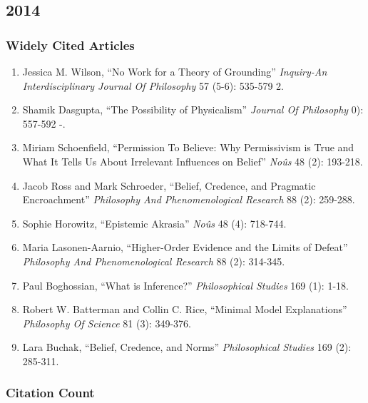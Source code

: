 \documentclass[
  10pt,
  letterpaper,
  DIV=11,
  numbers=noendperiod,
  twoside]{scrartcl}
\providecommand{\tightlist}{%
  \setlength{\itemsep}{0pt}\setlength{\parskip}{0pt}}\usepackage{longtable,booktabs,array}
\begin{document}
\newpage

\subsection{2014}\label{section-38}

\subsubsection*{Widely Cited Articles}\label{widely-cited-articles-38}

\begin{enumerate}
\def\labelenumi{\arabic{enumi}.}
\tightlist
\item
  Jessica M. Wilson, ``No Work for a Theory of Grounding''
  \emph{Inquiry-An Interdisciplinary Journal Of Philosophy} 57 (5-6):
  535-579 2.
\item
  Shamik Dasgupta, ``The Possibility of Physicalism'' \emph{Journal Of
  Philosophy} 0): 557-592 -.
\item
  Miriam Schoenfield, ``Permission To Believe: Why Permissivism is True
  and What It Tells Us About Irrelevant Influences on Belief''
  \emph{Noûs} 48 (2): 193-218.
\item
  Jacob Ross and Mark Schroeder, ``Belief, Credence, and Pragmatic
  Encroachment'' \emph{Philosophy And Phenomenological Research} 88 (2):
  259-288.
\item
  Sophie Horowitz, ``Epistemic Akrasia'' \emph{Noûs} 48 (4): 718-744.
\item
  Maria Lasonen-Aarnio, ``Higher-Order Evidence and the Limits of
  Defeat'' \emph{Philosophy And Phenomenological Research} 88 (2):
  314-345.
\item
  Paul Boghossian, ``What is Inference?'' \emph{Philosophical Studies}
  169 (1): 1-18.
\item
  Robert W. Batterman and Collin C. Rice, ``Minimal Model Explanations''
  \emph{Philosophy Of Science} 81 (3): 349-376.
\item
  Lara Buchak, ``Belief, Credence, and Norms'' \emph{Philosophical
  Studies} 169 (2): 285-311.
\end{enumerate}

\subsubsection*{Citation Count}\label{citation-count-38}
\end{document}
